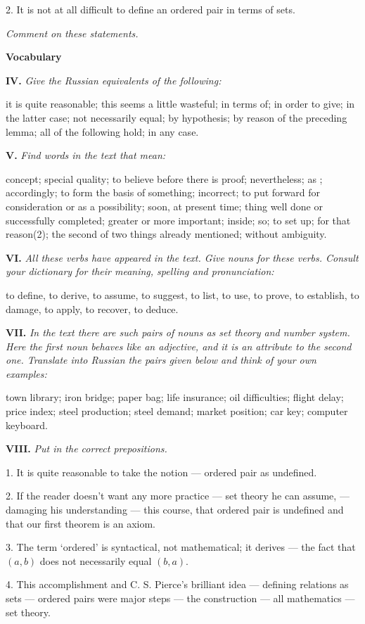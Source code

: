 \documentclass[a4paper]{article}
\newcommand{\ESect}[1]{\medskip\par{\large \textbf{#1}}\par}
\newcommand{\ETask}[2]{\medskip\par\textbf{#1.} \textit{#2}\par}
\begin{document}
2. It is not at all difficult to define an ordered pair in terms of sets.

\textit{Comment on these statements.}

\ESect{Vocabulary}

\ETask{IV}{Give the Russian equivalents of the following:}
it is quite reasonable; this seems a little wasteful; in terms of; in order to give; in the latter case; not necessarily equal;
by hypothesis; by reason of the preceding lemma; all of the following hold; in any case.

\ETask{V}{Find words in the text that mean:}
concept; special quality; to believe before there is proof; nevertheless; as ; accordingly; to form the basis of something;
incorrect; to put forward for consideration or as a possibility; soon, at present time; thing well done or successfully completed;
greater or more important; inside; so; to set up; for that reason(2); the second of two things already mentioned; without ambiguity.

\ETask{VI}{All these verbs have appeared in the text. Give nouns for these verbs. Consult your dictionary for their meaning,
spelling and pronunciation:}
to define, to derive, to assume, to suggest, to list, to use, to prove, to establish, to damage, to apply, to recover, to deduce.

\ETask{VII}{In the text there are such pairs of nouns as set theory and number system. Here the first noun behaves like an adjective,
and it is an attribute to the second one. Translate into Russian the pairs given below and think of your own examples:}
town library; iron bridge; paper bag; life insurance; oil difficulties; flight delay; price index; steel production; steel
demand; market position; car key; computer keyboard.

\ETask{VIII}{Put in the correct prepositions.}
1. It is quite reasonable to take the notion --- ordered pair as undefined.

2. If the reader doesn't want any more practice --- set theory he can assume, --- damaging his understanding --- this course,
that ordered pair is undefined and that our first theorem is an axiom.

3. The term `ordered' is syntactical, not mathematical; it derives --- the fact that $(a, b)$ does not necessarily equal $(b,a)$.

4. This accomplishment and C. S. Pierce's brilliant idea --- defining relations as sets --- ordered pairs were major steps --- the
construction --- all mathematics --- set theory.
\end{document}
